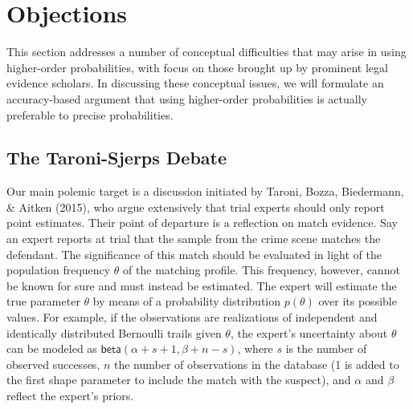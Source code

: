 \documentclass[
  10pt,
  dvipsnames,enabledeprecatedfontcommands]{scrartcl}
\newcommand{\s}[1]{\mbox{$\mathsf{#1}$}}
\begin{document}
\hypertarget{objections}{%
\section{Objections}\label{objections}}

\label{sec:objections}

This section addresses a number of conceptual difficulties that may
arise in using higher-order probabilities, with focus on those brought
up by prominent legal evidence scholars. In discussing these conceptual
issues, we will formulate an accuracy-based argument that using
higher-order probabilities is actually preferable to precise
probabilities.

\hypertarget{the-taroni-sjerps-debate}{%
\subsection{The Taroni-Sjerps Debate}\label{the-taroni-sjerps-debate}}

Our main polemic target is a discussion initiated by Taroni, Bozza,
Biedermann, \& Aitken (2015), who argue extensively that trial experts
should only report point estimates. Their point of departure is a
reflection on match evidence. Say an expert reports at trial that the
sample from the crime scene matches the defendant. The significance of
this match should be evaluated in light of the population frequency
\(\theta\) of the matching profile. This frequency, however, cannot be
known for sure and must instead be estimated. The expert will estimate
the true parameter \(\theta\) by means of a probability distribution
\(p(\theta)\) over its possible values. For example, if the observations
are realizations of independent and identically distributed Bernoulli
trails given \(\theta\), the expert's uncertainty about \(\theta\) can
be modeled as \(\s{beta}(\alpha + s + 1 ,\beta + n - s)\), where \(s\)
is the number of observed successes, \(n\) the number of observations in
the database (1 is added to the first shape parameter to include the
match with the suspect), and \(\alpha\) and \(\beta\) reflect the
expert's priors.
\end{document}
